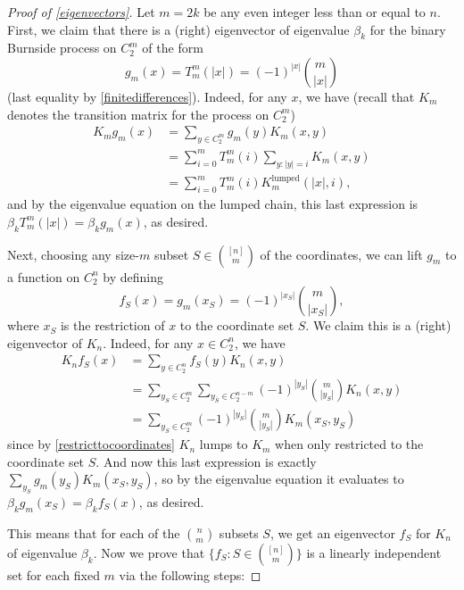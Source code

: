 \documentclass[11pt]{article}
\newcounter{r}
\newcounter{s}
\numberwithin{equation}{section}
\begin{document}
\begin{proof}[Proof of \cref{eigenvectors}]
Let $m = 2k$ be any even integer less than or equal to $n$. First, we claim that there is a (right) eigenvector of eigenvalue $\beta_k$ for the binary Burnside process on $C_2^m$ of the form
\[
    g_m(x) = T_m^m(|x|) = (-1)^{|x|} \binom{m}{|x|}
\]
(last equality by \cref{finitedifferences}). Indeed, for any $x$, we have (recall that $K_m$ denotes the transition matrix for the process on $C_2^m$)
\begin{align}\label{lumpedtounlumped}
    K_{m} g_m(x) &= \sum_{y \in C_2^{m}} g_m(y) K_{m}(x, y)\nonumber \\
    &= \sum_{i=0}^{m} T_m^{m}(i) \sum_{y: |y| = i} K_{m}(x, y)\nonumber \\ 
    &= \sum_{i=0}^{m} T_m^{m}(i) K_{m}^{\text{lumped}}(|x|, i), 
\end{align}
and by the eigenvalue equation on the lumped chain, this last expression is $\beta_k T_m^{m}(|x|) = \beta_k g_m(x)$, as desired. 

Next, choosing any size-$m$ subset $S \in \binom{[n]}{m}$ of the coordinates, we can lift $g_m$ to a function on $C_2^n$ by defining
\[
    f_S(x) = g_m(x_S) = (-1)^{|x_S|} \binom{m}{|x_S|},
\]
where $x_S$ is the restriction of $x$ to the coordinate set $S$. We claim this is a (right) eigenvector of $K_n$. Indeed, for any $x \in C_2^n$, we have
\begin{align*}
    K_nf_S(x) &= \sum_{y \in C_2^n} f_S(y) K_n(x, y) \\
    &= \sum_{y_S \in C_2^{m}} \sum_{y_{\overline{S}} \in C_2^{n - m}} (-1)^{|y_S|} \binom{m}{|y_S|} K_n(x, y) \\
    &= \sum_{y_S \in C_2^{m}} (-1)^{|y_S|} \binom{m}{|y_S|} K_{m}(x_S, y_S)
\end{align*}
since by \cref{restricttocoordinates} $K_n$ lumps to $K_{m}$ when only restricted to the coordinate set $S$. And now this last expression is exactly $\sum_{y_S} g_m (y_S) K_{m}(x_S, y_S)$, so by the eigenvalue equation it evaluates to $\beta_k g_m(x_S) = \beta_k f_S(x)$, as desired.

\medskip

This means that for each of the $\binom{n}{m}$ subsets $S$, we get an eigenvector $f_S$ for $K_n$ of eigenvalue $\beta_k$. Now we prove that $\{f_S: S \in \binom{[n]}{m}\}$ is a linearly independent set for each fixed $m$ via the following steps:


\end{proof}
\end{document}
